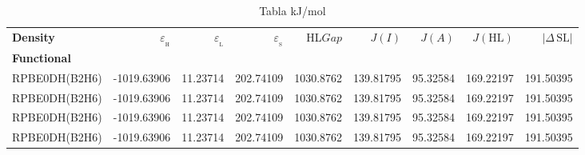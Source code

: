 \documentclass[preprint,landscape,12pt]{elsarticle}
\begin{document}
	\begin{table}
		\caption{ Tabla kJ/mol}
		\centering
		\footnotesize
		\begin{tabular}{lrrrrrrrr}
			\hline
			\textbf{Density}    & $\varepsilon_{_{\mathrm{H}}}$	& $\varepsilon_{_{\mathrm{L}}}$  & $\varepsilon_{_{\mathrm{S}}}$& HL$Gap$ & $J(I)$ & $J(A)$ & $J(\mathrm{HL})$  & \textbf{$\left|\Delta\,\mathrm{SL}\right|$}  \\
			\textbf{Functional} &   &  &     &   &  &  &  &  \\
			\hline \hline 

RPBE0DH(B2H6) & -1019.63906 & 11.23714 & 202.74109 & 1030.8762 & 139.81795 & 95.32584 & 169.22197 & 191.50395\\
RPBE0DH(B2H6) & -1019.63906 & 11.23714 & 202.74109 & 1030.8762 & 139.81795 & 95.32584 & 169.22197 & 191.50395\\
RPBE0DH(B2H6) & -1019.63906 & 11.23714 & 202.74109 & 1030.8762 & 139.81795 & 95.32584 & 169.22197 & 191.50395\\
RPBE0DH(B2H6) & -1019.63906 & 11.23714 & 202.74109 & 1030.8762 & 139.81795 & 95.32584 & 169.22197 & 191.50395\\

	 		\hline
		\end{tabular}
			\label{tab:kJ/mol}
	\end{table}
\end{document}
